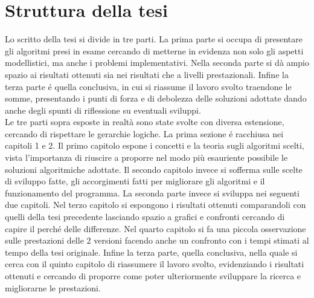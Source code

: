 \section{Struttura della tesi}
Lo scritto della tesi si divide in tre parti.
La prima parte si occupa di presentare gli algoritmi presi in esame cercando di metterne in evidenza
non solo gli aspetti modellistici, ma anche i problemi implementativi.
Nella seconda parte si d\`a ampio spazio ai risultati ottenuti sia nei risultati che a livelli
prestazionali.
Infine la terza parte \'e quella conclusiva, in cui si riassume il lavoro svolto traendone
le somme, presentando i punti di forza e di debolezza delle soluzioni
adottate dando anche degli spunti di riflessione su eventuali sviluppi.\\

Le tre parti sopra esposte in realt\`a sono state svolte con diversa estensione,
cercando di rispettare le gerarchie logiche.
La prima sezione \'e racchiusa nei capitoli 1 e 2.
Il primo capitolo espone i concetti e la teoria sugli algoritmi scelti, vista l'importanza di
riuscire a proporre nel modo pi\`u esauriente possibile le soluzioni algoritmiche
adottate. Il secondo capitolo invece si sofferma sulle scelte di sviluppo fatte, gli accorgimenti fatti per migliorare
gli algoritmi e il funzionamento del programma.
La seconda parte invece si sviluppa nei seguenti due capitoli.
Nel terzo capitolo si espongono i risultati ottenuti comparandoli con quelli
della tesi precedente lasciando spazio a grafici e confronti cercando
di capire il perch\'e delle differenze.
Nel quarto capitolo si fa una piccola osservazione sulle prestazioni delle 2 versioni
facendo anche un confronto con i tempi stimati al tempo della tesi originale.
Infine la terza parte, quella conclusiva, nella quale si cerca con il quinto capitolo
di riassumere il lavoro svolto, evidenziando i risultati ottenuti e cercando
di proporre come poter ulteriormente sviluppare la ricerca e migliorarne le prestazioni.
